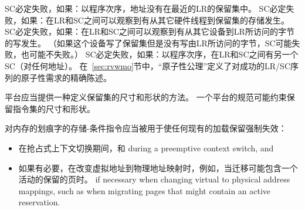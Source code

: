 SC必定失败，如果：以程序次序，地址没有在最近的LR的保留集中。
SC必定失败，如果：在LR和SC之间可以观察到有从其它硬件线程到保留集的存储发生。
SC必定失败，如果：在LR和SC之间可以观察到有从其它设备到LR所访问的字节的写发生。
（如果这个设备写了保留集但是没有写由LR所访问的字节，SC可能失败，也可能不失败。）
SC必定失败，如果：以程序次序，在LR和SC之间有另一个SC（对任何地址）。
在~\ref{sec:rvwmo}节中，“原子性公理”定义了对成功的LR/SC序列的原子性需求的精确陈述。

\begin{commentary}
  平台应当提供一种定义保留集的尺寸和形状的方法。
  一个平台的规范可能约束保留指令集的尺寸和形状。
\end{commentary}

\begin{commentary}
  对内存的划痕字的存储-条件指令应当被用于使任何现有的加载保留强制失效：
\begin{itemize}
\item 在抢占式上下文切换期间，和   during a preemptive context switch, and
\item 如果有必要，在改变虚拟地址到物理地址映射时，例如，当迁移可能包含一个活动的保留的页时。  if necessary when changing virtual to physical address mappings,
  such as when migrating pages that might contain an active reservation.
\end{itemize}
\end{commentary}

